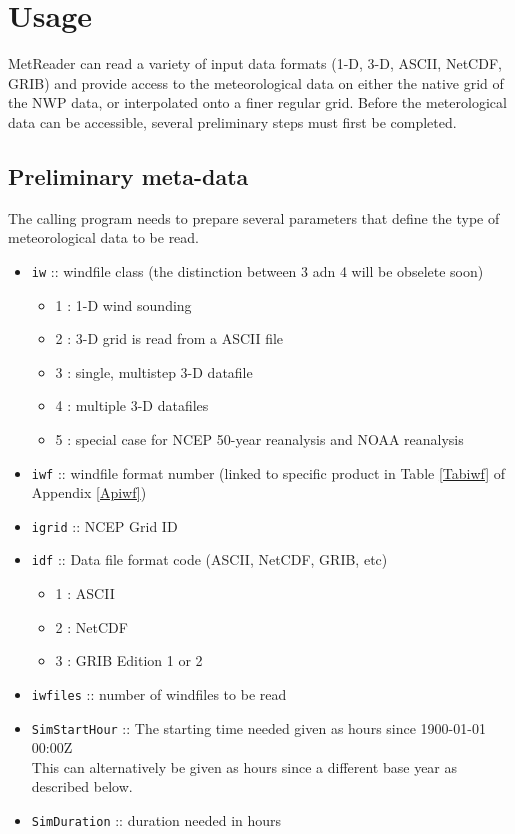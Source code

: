 \documentclass[11pt]{article}   %
\begin{document}
\clearpage
\section{Usage}
MetReader can read a variety of input data formats (1-D, 3-D, ASCII, NetCDF, GRIB) and
provide access to the meteorological data on either the native grid of the NWP data, or interpolated
onto a finer regular grid.  Before the meterological data can be accessible, several preliminary steps
must first be completed.
\subsection{Preliminary meta-data}\label{SSecPrelimMetaData}
The calling program needs to prepare several parameters that define the type of meteorological
data to be read.  
\begin{itemize}
\item \texttt{iw} :: windfile class (the distinction between 3 adn 4 will be obselete soon)
 \begin{itemize}
 \item 1 : 1-D wind sounding
 \item 2 : 3-D grid is read from a ASCII file
 \item 3 : single, multistep 3-D datafile
 \item 4 : multiple 3-D datafiles
 \item 5 : special case for NCEP 50-year reanalysis and NOAA reanalysis
 \end{itemize}
\item \texttt{iwf} :: windfile format number (linked to specific product in Table
  \ref{Tabiwf} of Appendix \ref{Apiwf})
\item \texttt{igrid} :: NCEP Grid ID
\item \texttt{idf} :: Data file format code (ASCII, NetCDF, GRIB, etc)
 \begin{itemize}
 \item   1 : ASCII
 \item   2 : NetCDF
 \item   3 : GRIB Edition 1 or 2
 \end{itemize}
\item \texttt{iwfiles} :: number of windfiles to be read
\item \texttt{SimStartHour} ::  The starting time needed given as hours since 1900-01-01 00:00Z\\
This can alternatively be given as hours since a different base year as described below.
\item \texttt{SimDuration} ::  duration needed in hours
\end{itemize}
\end{document}
